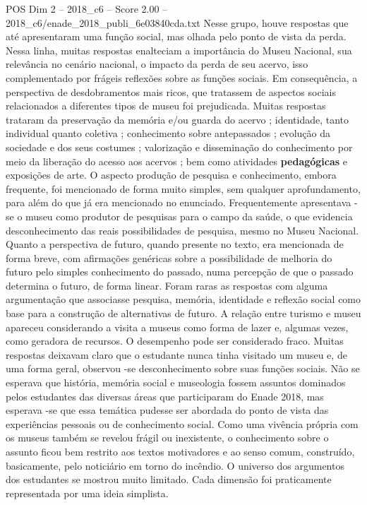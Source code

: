 \begin{textsample}{POS Dim 2 – 2018\_c6 – Score 2.00 – 2018\_c6/enade\_2018\_publi\_6e03840cda.txt}
Nesse grupo, houve respostas que até apresentaram uma função social, mas olhada pelo ponto de vista da perda.
Nessa linha, muitas respostas enalteciam a importância do Museu Nacional, sua relevância no cenário nacional, o impacto da perda de seu acervo, isso complementado por frágeis reflexões sobre as funções sociais.
Em consequência, a perspectiva de desdobramentos mais ricos, que tratassem de aspectos sociais relacionados a diferentes tipos de museu foi prejudicada.
Muitas respostas trataram da preservação da memória e/ou guarda do acervo ; identidade, tanto individual quanto coletiva ; conhecimento sobre antepassados ; evolução da sociedade e dos seus costumes ; valorização e disseminação do conhecimento por meio da liberação do acesso aos acervos ; bem como atividades \textbf{pedagógicas} e exposições de arte.
O aspecto produção de pesquisa e conhecimento, embora frequente, foi mencionado de forma muito simples, sem qualquer aprofundamento, para além do que já era mencionado no enunciado.
Frequentemente apresentava -se o museu como produtor de pesquisas para o campo da saúde, o que evidencia desconhecimento das reais possibilidades de pesquisa, mesmo no Museu Nacional.
Quanto a perspectiva de futuro, quando presente no texto, era mencionada de forma breve, com afirmações genéricas sobre a possibilidade de melhoria do futuro pelo simples conhecimento do passado, numa percepção de que o passado determina o futuro, de forma linear.
Foram raras as respostas com alguma argumentação que associasse pesquisa, memória, identidade e reflexão social como base para a construção de alternativas de futuro.
A relação entre turismo e museu apareceu considerando a visita a museus como forma de lazer e, algumas vezes, como geradora de recursos.
O desempenho pode ser considerado fraco.
Muitas respostas deixavam claro que o estudante nunca tinha visitado um museu e, de uma forma geral, observou -se desconhecimento sobre suas funções sociais.
Não se esperava que história, memória social e museologia fossem assuntos dominados pelos estudantes das diversas áreas que participaram do Enade 2018, mas esperava -se que essa temática pudesse ser abordada do ponto de vista das experiências pessoais ou de conhecimento social.
Como uma vivência própria com os museus também se revelou frágil ou inexistente, o conhecimento sobre o assunto ficou bem restrito aos textos motivadores e ao senso comum, construído, basicamente, pelo noticiário em torno do incêndio.
O universo dos argumentos dos estudantes se mostrou muito limitado.
Cada dimensão foi praticamente representada por uma ideia simplista.

\end{textsample}
